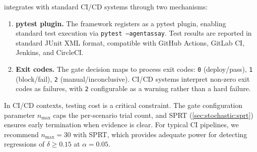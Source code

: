 \agentassay{} integrates with standard CI/CD systems through two
mechanisms:

\begin{enumerate}[leftmargin=*]
  \item \textbf{pytest plugin.} The framework registers as a pytest
    plugin, enabling standard test execution via \texttt{pytest
    --agentassay}. Test results are reported in standard
    JUnit XML format, compatible with GitHub Actions, GitLab CI,
    Jenkins, and CircleCI.

  \item \textbf{Exit codes.} The gate decision maps to process exit
    codes: \texttt{0} (deploy/pass), \texttt{1} (block/fail),
    \texttt{2} (manual/inconclusive). CI/CD systems interpret non-zero
    exit codes as failures, with \texttt{2} configurable as a warning
    rather than a hard failure.
\end{enumerate}

\begin{remark}
In CI/CD contexts, testing cost is a critical constraint. The gate
configuration parameter $n_{\max}$ caps the per-scenario trial count,
and SPRT (\cref{sec:stochastic:sprt}) ensures early termination when
evidence is clear. For typical CI pipelines, we recommend
$n_{\max} = 30$ with SPRT, which provides adequate power for detecting
regressions of $\delta \geq 0.15$ at $\alpha = 0.05$.
\end{remark}
